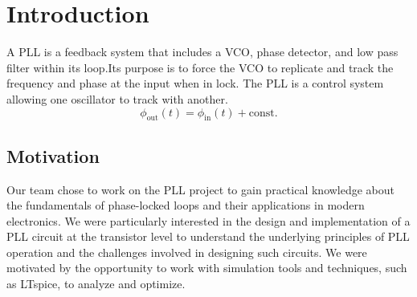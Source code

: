 \chapter{Introduction}
 A PLL is a feedback system that includes a VCO, phase detector, and low pass filter within its loop.Its purpose is to force the VCO to replicate and track the frequency and phase at the input when in lock. The PLL is a control system allowing one oscillator to track with another.
\begin{equation}
    \phi_{\text{out}}(t) = \phi_{\text{in}}(t) + \text{const.}
\end{equation}

\section{Motivation}
Our team chose to work on the PLL project to gain practical knowledge about the fundamentals of phase-locked loops and their applications in modern electronics. We were particularly interested in the design and implementation of a PLL circuit at the transistor level to understand the underlying principles of PLL operation and the challenges involved in designing such circuits. We were motivated by the opportunity to work with simulation tools and techniques, such as LTspice, to analyze and optimize.


